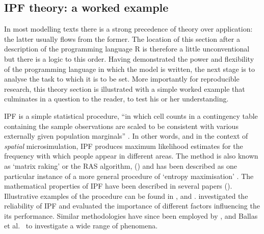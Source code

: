 \subsection{IPF theory: a worked example} \label{s:theory}
In most modelling texts there is a strong precedence of theory over
application: the latter usually flows from the former. The location 
of this section after a description of the programming language
R is therefore a little unconventional but there is a logic to this order. 
Having demonstrated the power and flexibility of the programming language in
which the model is written, the next stage is to analyse the task to which it
is to be set. More importantly for reproducible research, this theory section
is illustrated with a simple worked example that culminates in
a question to the reader, to test his or her understanding.

IPF is a simple statistical procedure, ``in which cell counts in a contingency
table containing the sample observations are scaled to be consistent with
various externally given population marginals'' \citep{mcfadden2006testing}. In
other words, and in the context of \emph{spatial} microsimulation, IPF produces
maximum likelihood estimates for the frequency with which people appear in
different areas. The method is also known as `matrix raking' or the RAS
algorithm, (\citealp{Birkin1988, Muller2010,
Simpson2005, Kalantari2008, Jirousek1995}) and has been described as one
particular instance of a more general procedure of `entropy maximisation'
\citep{Johnston1993, blien1998entropy}.
The mathematical properties of IPF
have been described in several papers
(\citealp{Bishop1975, Fienberg1970, Birkin1988}).
Illustrative examples of the procedure can be found in
\citet{Saito1992}, \citet{Wong1992}
and \citet{Norman1999a}. \citet{Wong1992} investigated the reliability of IPF
and evaluated the importance of different factors influencing the its
performance. Similar methodologies have since been employed by
\citet{Mitchell2000}, \citet{Williamson2002} and
Ballas et al.~\citeyearpar{Ballas2005c, Ballas2005}
to investigate a wide range of phenomena.

